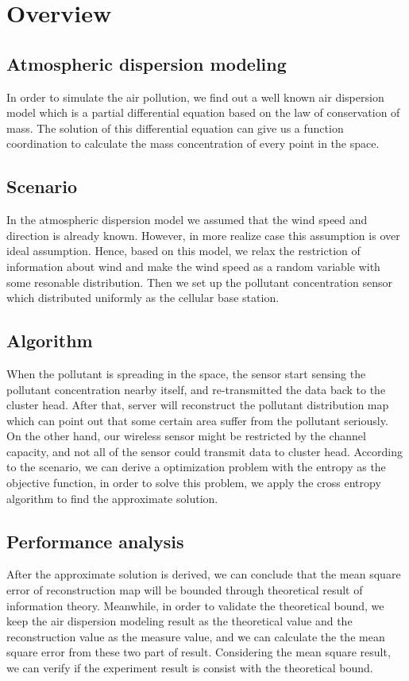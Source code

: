 \section{Overview}

\subsection{Atmospheric dispersion modeling}
In order to simulate the air pollution, we find out a well known air dispersion 
model which is a partial differential equation based on the law of 
conservation of mass. The solution of this differential equation can give us 
a function coordination to calculate the mass concentration of every point in 
the space.  


\subsection{Scenario}
In the atmospheric dispersion model we assumed that the wind speed and direction
is already known. However, in more realize case this assumption is over ideal 
assumption. Hence, based on this model, we relax the restriction of information 
about wind and make the wind speed as a random variable with some resonable 
distribution. Then we set up the  pollutant concentration sensor which distributed
uniformly as the cellular base station. 

\subsection{Algorithm}
When the pollutant is spreading in the space, the sensor start sensing the 
pollutant concentration nearby itself, and re-transmitted the data back to the 
cluster head. After that, server will reconstruct the pollutant distribution map 
which can point out that some certain area suffer from the pollutant seriously.
On the other hand, our wireless sensor might be restricted by the channel capacity,
and not all of the sensor could transmit data to cluster head. According to the 
scenario, we can derive a optimization problem with the entropy as the objective
function, in order to solve this problem, we apply the cross entropy algorithm
to find the approximate solution.  
 
\subsection{Performance analysis}
After the approximate solution is derived, we can conclude that the mean square
error of reconstruction map will be bounded through theoretical result of information
theory. Meanwhile, in order to validate the theoretical bound, we keep the air 
dispersion modeling result as the theoretical value and the reconstruction value 
as the measure value, and we can calculate the the mean square error from these two
part of result. Considering the mean square result, we can verify if the experiment 
result is consist with the theoretical bound. 



